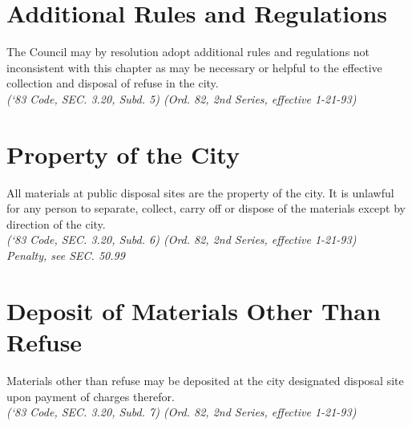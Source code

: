 \section{Additional Rules and Regulations}
The Council may by resolution adopt additional rules and regulations not inconsistent with this chapter as may be necessary or helpful to the effective collection and disposal of refuse in the city.\\
\emph{(‘83 Code, SEC. 3.20, Subd. 5) (Ord. 82, 2nd Series, effective 1-21-93)}
\section{Property of the City}
All materials at public disposal sites are the property of the city.  It is unlawful for any person to separate, collect, carry off or dispose of the materials except by direction of the city.\\
\emph{(‘83 Code, SEC. 3.20, Subd. 6) (Ord. 82, 2nd Series, effective 1-21-93)}\\
\emph{Penalty, see SEC. 50.99}
\section{Deposit of Materials Other Than Refuse}
Materials other than refuse may be deposited at the city designated disposal site upon payment of charges therefor.\\
\emph{(‘83 Code, SEC. 3.20, Subd. 7) (Ord. 82, 2nd Series, effective 1-21-93)}
